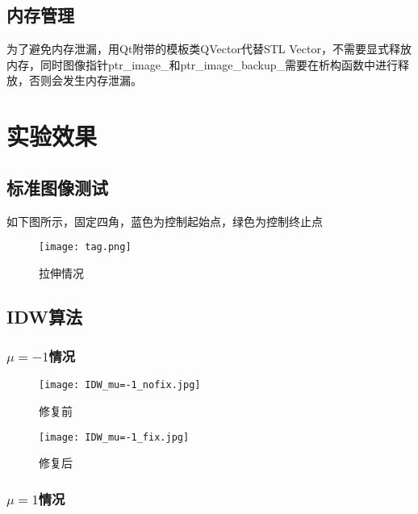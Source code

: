 \documentclass[14pt]{scrartcl} %
\begin{document}
\subsection{内存管理}

为了避免内存泄漏，用Qt附带的模板类QVector代替STL Vector，不需要显式释放内存，同时图像指针ptr\_image\_和ptr\_image\_backup\_需要在析构函数中进行释放，否则会发生内存泄漏。



\pagebreak

\section{实验效果}

\subsection{标准图像测试}
如下图所示，固定四角，蓝色为控制起始点，绿色为控制终止点
\begin{figure}[h] %
	\centering
	\texttt{[image: tag.png]} %
	\caption{拉伸情况}
\end{figure}

\subsection{IDW算法}

\subsubsection{$\mu=-1$情况}

\begin{figure}[h] %
	\begin{minipage}[t]{0.5\linewidth}
		\centering
		\texttt{[image: IDW\_mu=-1\_nofix.jpg]}
		\caption{修复前}
	\end{minipage}%
	\begin{minipage}[t]{0.5\linewidth}
		\centering
		\texttt{[image: IDW\_mu=-1\_fix.jpg]}
		\caption{修复后}
	\end{minipage}
\end{figure}

\subsubsection{$\mu=1$情况}
\end{document}
